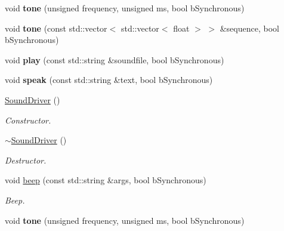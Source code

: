 \begin{DoxyCompactItemize}
\mbox{\label{classSoundDriver_a73ac421559404c201308915ad9e4f8e0}} 
void {\bfseries tone} (unsigned frequency, unsigned ms, bool b\+Synchronous)
\item 
\mbox{\label{classSoundDriver_a39ea1b35ab6091e79663fa489cdcff25}} 
void {\bfseries tone} (const std\+::vector$<$ std\+::vector$<$ float $>$ $>$ \&sequence, bool b\+Synchronous)
\item 
\mbox{\label{classSoundDriver_afd64ca3d517d01947d514eb689027eea}} 
void {\bfseries play} (const std\+::string \&soundfile, bool b\+Synchronous)
\item 
\mbox{\label{classSoundDriver_a44869623a4c7ad03e9a65388647bc10c}} 
void {\bfseries speak} (const std\+::string \&text, bool b\+Synchronous)
\item 
\mbox{\label{classSoundDriver_aa45970b1e9155eb51a155cc7ef4389dc}} 
\hyperlink{classSoundDriver_aa45970b1e9155eb51a155cc7ef4389dc}{Sound\+Driver} ()
\begin{DoxyCompactList}\small\item\em Constructor. \end{DoxyCompactList}\item 
\mbox{\label{classSoundDriver_a45845cb8587a626a4ab6a2c53dcdf7c0}} 
\hyperlink{classSoundDriver_a45845cb8587a626a4ab6a2c53dcdf7c0}{$\sim$\+Sound\+Driver} ()
\begin{DoxyCompactList}\small\item\em Destructor. \end{DoxyCompactList}\item 
\mbox{\label{classSoundDriver_a33bbfa860cd88f113d1fbf4bf68708ba}} 
void \hyperlink{classSoundDriver_a33bbfa860cd88f113d1fbf4bf68708ba}{beep} (const std\+::string \&args, bool b\+Synchronous)
\begin{DoxyCompactList}\small\item\em Beep. \end{DoxyCompactList}\item 
\mbox{\label{classSoundDriver_a73ac421559404c201308915ad9e4f8e0}} 
void {\bfseries tone} (unsigned frequency, unsigned ms, bool b\+Synchronous)

\end{DoxyCompactItemize}
